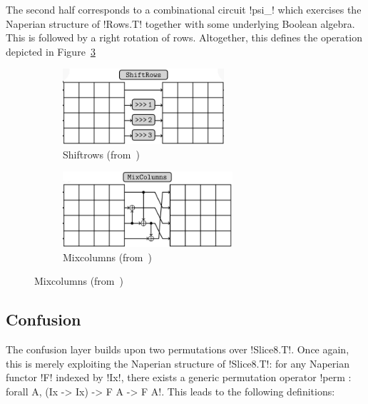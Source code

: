 \documentclass[draft,english]{jflart}
\begin{document}

The second half corresponds to a combinational circuit \coqe!psi_!
%
%
which exercises the Naperian structure of \coqe!Rows.T! together with
some underlying Boolean algebra. This is followed by a right rotation
of rows. Altogether, this defines the operation depicted in Figure~\ref{fig:mixcolumns}
%

\begin{figure}[htp]
  \centering
  \begin{subfigure}[t]{0.45\textwidth}
    \centering
    \includegraphics[draft=false,height=2.8cm]{shiftrows}
    \caption{Shiftrows (from~\citet{skinny-spec})}
    \label{fig:shiftrows}
  \end{subfigure}
  \begin{subfigure}[t]{0.45\textwidth}
    \centering
    \includegraphics[draft=false,height=2.8cm]{mixcolumns}
    \caption{Mixcolumns (from~\citet{skinny-spec})}
    \label{fig:mixcolumns}
  \end{subfigure}
\end{figure}

\subsection{Confusion}


The confusion layer builds upon two permutations over \coqe!Slice8.T!.
Once again, this is merely exploiting the Naperian structure of
\coqe!Slice8.T!: for any Naperian functor \coqe!F! indexed by
\coqe!Ix!, there exists a generic permutation operator
%
\coqe!perm : forall A, (Ix -> Ix) -> F A -> F A!.
%
This leads to the following definitions:
%
\end{document}
